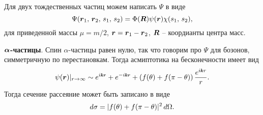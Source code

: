 

Для двух тождественных частиц можем написать $\Psi$ в виде
\begin{equation*}
	\Psi(\mbox{\boldmath $r$}_1,\, \mbox{\boldmath $r$}_2,\, s_1,\, s_2) = \Phi(\mbox{\boldmath $R$}) \psi(\mbox{\boldmath $r$}) \chi(s_1,\, s_2),
\end{equation*}
для приведенной массы $\mu = m/2$, $\mbox{\boldmath $r$} = \mbox{\boldmath $r$}_1 - \mbox{\boldmath $r$}_2$, $\mbox{\boldmath $R$}$ -- коордианты центра масс. 

\textbf{$\mbox{\boldmath $\alpha$}$-частицы}. Спин $\alpha$-частицы равен нулю, так что говорим про $\Psi$ для бозонов, симметричную по перестановкам. Тогда асмиптотика на бесконечности имеет вид
\begin{equation*}
	\psi(\vc{r})|_{r\to \infty} \sim e^{i \smallvc{k} \smallvc{r}} + e^{- i \smallvc{k} \smallvc{r}} + \left(
		f(\theta) + f(\pi-\theta)
	\right) \frac{e^{i \smallvc{k} r}}{r}.
\end{equation*}
Тогда сечение рассеяние может быть записано в виде
\begin{equation*}
	d \sigma = |f(\theta) + f(\pi-\theta)|^2 \, d \Omega.
\end{equation*}


